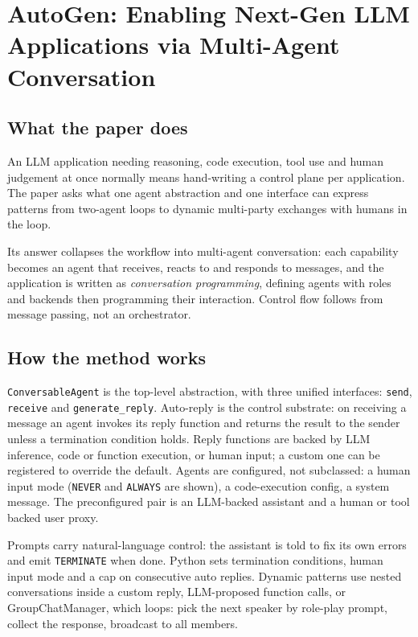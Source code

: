 \section{AutoGen: Enabling Next-Gen LLM Applications via Multi-Agent Conversation}

\subsection{What the paper does}

An LLM application needing reasoning, code execution, tool use and human judgement at once normally means hand-writing a control plane per application. The paper asks what one agent abstraction and one interface can express patterns from two-agent loops to dynamic multi-party exchanges with humans in the loop.

Its answer collapses the workflow into multi-agent conversation: each capability becomes an agent that receives, reacts to and responds to messages, and the application is written as \emph{conversation programming}, defining agents with roles and backends then programming their interaction. Control flow follows from message passing, not an orchestrator.

\subsection{How the method works}

\texttt{ConversableAgent} is the top-level abstraction, with three unified interfaces: \texttt{send}, \texttt{receive} and \texttt{generate\_reply}. Auto-reply is the control substrate: on receiving a message an agent invokes its reply function and returns the result to the sender unless a termination condition holds. Reply functions are backed by LLM inference, code or function execution, or human input; a custom one can be registered to override the default. Agents are configured, not subclassed: a human input mode (\texttt{NEVER} and \texttt{ALWAYS} are shown), a code-execution config, a system message. The preconfigured pair is an LLM-backed assistant and a human or tool backed user proxy.

Prompts carry natural-language control: the assistant is told to fix its own errors and emit \texttt{TERMINATE} when done. Python sets termination conditions, human input mode and a cap on consecutive auto replies. Dynamic patterns use nested conversations inside a custom reply, LLM-proposed function calls, or GroupChatManager, which loops: pick the next speaker by role-play prompt, collect the response, broadcast to all members.

